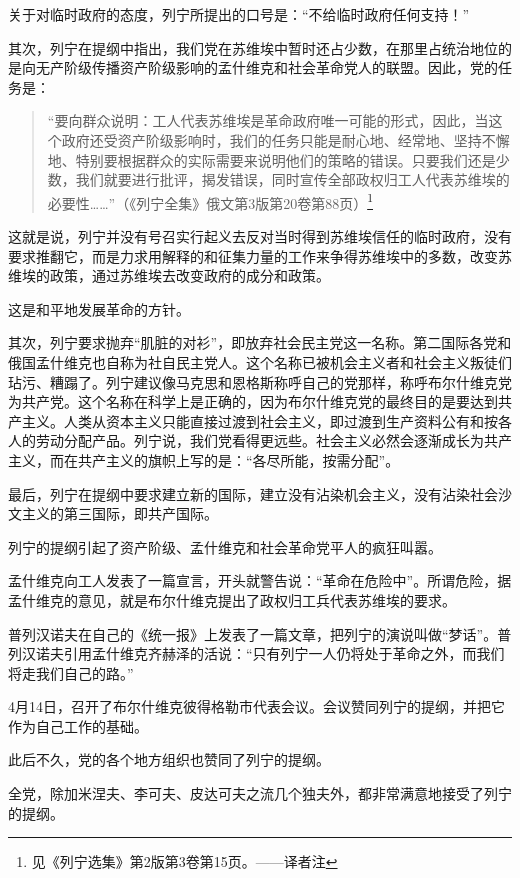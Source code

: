 关于对临时政府的态度，列宁所提出的口号是：“不给临时政府任何支持！”

其次，列宁在提纲中指出，我们党在苏维埃中暂时还占少数，在那里占统治地位的是向无产阶级传播资产阶级影响的孟什维克和社会革命党人的联盟。因此，党的任务是：

\begin{quotation}
“要向群众说明：工人代表苏维埃是革命政府唯一可能的形式，因此，当这个政府还受资产阶级影响时，我们的任务只能是耐心地、经常地、坚持不懈地、特别要根据群众的实际需要来说明他们的策略的错误。只要我们还是少数，我们就要进行批评，揭发错误，同时宣传全部政权归工人代表苏维埃的必要性……”（《列宁全集》俄文第3版第20卷第88页）\footnote{见《列宁选集》第2版第3卷第15页。——译者注}
\end{quotation}

这就是说，列宁并没有号召实行起义去反对当时得到苏维埃信任的临时政府，没有要求推翻它，而是力求用解释的和征集力量的工作来争得苏维埃中的多数，改变苏维埃的政策，通过苏维埃去改变政府的成分和政策。

这是和平地发展革命的方针。

其次，列宁要求抛弃“肌脏的对衫”，即放弃社会民主党这一名称。第二国际各党和俄国孟什维克也自称为社自民主党人。这个名称已被机会主义者和社会主义叛徒们玷污、糟蹋了。列宁建议像马克思和恩格斯称呼自己的党那样，称呼布尔什维克党为共产党。这个名称在科学上是正确的，因为布尔什维克党的最终目的是要达到共产主义。人类从资本主义只能直接过渡到社会主义，即过渡到生产资料公有和按各人的劳动分配产品。列宁说，我们党看得更远些。社会主义必然会逐渐成长为共产主义，而在共产主义的旗帜上写的是：“各尽所能，按需分配”。

最后，列宁在提纲中要求建立新的国际，建立没有沾染机会主义，没有沾染社会沙文主义的第三国际，即共产国际。

列宁的提纲引起了资产阶级、孟什维克和社会革命党平人的疯狂叫嚣。

孟什维克向工人发表了一篇宣言，开头就警告说：“革命在危险中”。所谓危险，据孟什维克的意见，就是布尔什维克提出了政权归工兵代表苏维埃的要求。

普列汉诺夫在自己的《统一报》上发表了一篇文章，把列宁的演说叫做“梦话”。普列汉诺夫引用孟什维克齐赫泽的活说：“只有列宁一人仍将处于革命之外，而我们将走我们自己的路。”

4月14日，召开了布尔什维克彼得格勒市代表会议。会议赞同列宁的提纲，并把它作为自己工作的基础。

此后不久，党的各个地方组织也赞同了列宁的提纲。

全党，除加米涅夫、李可夫、皮达可夫之流几个独夫外，都非常满意地接受了列宁的提纲。


